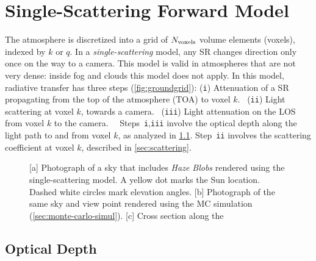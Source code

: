 \documentclass[10pt,letterpaper]{article}
\newcommand{\yoavcomment}[1]{}
\renewcommand{\yoavcomment}[1]{#1} %
\begin{document}
\section{Single-Scattering Forward Model}
\label{sec:single-scatt-model}

The atmosphere is discretized into a grid of $N_{\rm voxels}$ volume
elements (voxels), indexed by $k$ or $q$. In a
\emph{single-scattering} model, any SR changes direction only once on
the way to a camera. This model is valid in atmospheres that are not
very dense: inside fog and clouds this model does not apply. In this
model, radiative transfer has three steps (\cref{fig:groundgrid}):
({\tt i}) Attenuation of a SR propagating from the top of the
atmosphere (TOA) to voxel $k$. ~({\tt ii}) Light scattering at voxel
$k$, towards a camera. ~({\tt iii}) Light attenuation on the LOS from
voxel $k$ to the camera.~~ Steps~{\tt i},{\tt iii} involve the optical
depth along the light path to and from voxel $k$, as analyzed in
\cref{sec:optical-depth}.  Step~{\tt ii} involves the scattering
coefficient at voxel $k$, described in \cref{sec:scattering}.
\begin{figure}
  \centering
  \yoavcomment{\def\svgwidth{0.95\columnwidth}}
  \caption{\small [a] Photograph of a sky that includes {\em Haze
      Blobs} rendered using the single-scattering model.  A yellow dot
    marks the Sun location. Dashed white circles mark elevation
    angles.  [b] Photograph of the same sky and view point rendered
    using the MC simulation (\cref{sec:monte-carlo-simul}).
    [c] Cross section along the
  }
  \label{fig:simulation-results1}
\end{figure}


\subsection{Optical Depth}
\label{sec:optical-depth}
\end{document}

